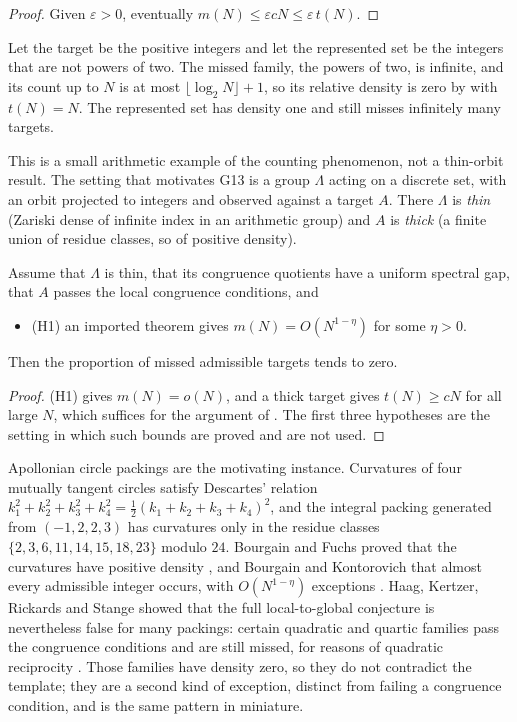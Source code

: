 \begin{proof}
Given $\varepsilon > 0$, eventually $m(N) \le \varepsilon c N \le \varepsilon\, t(N)$.
\end{proof}

\begin{example}\label{ex:G13-powers}
Let the target be the positive integers and let the represented set be the integers that are not
powers of two. The missed family, the powers of two, is infinite, and its count up to $N$ is at most
$\lfloor \log_2 N \rfloor + 1$, so its relative density is zero by  with
$t(N) = N$. The represented set has density one and still misses infinitely many targets.
\end{example}

This is a small arithmetic example of the counting phenomenon, not a thin-orbit result. The setting
that motivates G13 is a group $\Lambda$ acting on a discrete set, with an orbit projected to integers
and observed against a target $A$. There $\Lambda$ is \emph{thin} (Zariski dense of infinite index in
an arithmetic group) and $A$ is \emph{thick} (a finite union of residue classes, so of positive
density).

\begin{schema}\label{thm:G13}
Assume that $\Lambda$ is thin, that its congruence quotients have a uniform spectral gap, that $A$
passes the local congruence conditions, and
\begin{itemize}
  \item \textup{(H1)} an imported theorem gives $m(N) = O(N^{1-\eta})$ for some $\eta > 0$.
\end{itemize}
Then the proportion of missed admissible targets tends to zero.
\end{schema}

\begin{proof}
(H1) gives $m(N) = o(N)$, and a thick target gives $t(N) \ge cN$ for all large $N$, which suffices
for the argument of . The first three hypotheses are the setting in which such
bounds are proved and are not used.
\end{proof}

Apollonian circle packings are the motivating instance. Curvatures of four mutually tangent circles
satisfy Descartes' relation $k_1^2 + k_2^2 + k_3^2 + k_4^2 = \tfrac12 (k_1 + k_2 + k_3 + k_4)^2$,
and the integral packing generated from $(-1, 2, 2, 3)$ has curvatures only in the residue classes
$\{2, 3, 6, 11, 14, 15, 18, 23\}$ modulo $24$. Bourgain and Fuchs proved that the curvatures have
positive density \citep{BourgainFuchs2010}, and Bourgain and Kontorovich that almost every admissible
integer occurs, with $O(N^{1-\eta})$ exceptions \citep{BourgainKontorovich2014Apollonian}. Haag,
Kertzer, Rickards and Stange showed that the full local-to-global conjecture is nevertheless false
for many packings: certain quadratic and quartic families pass the congruence conditions and are
still missed, for reasons of quadratic reciprocity \citep{HaagEtAl2024}. Those families have density
zero, so they do not contradict the template; they are a second kind of exception, distinct from
failing a congruence condition, and  is the same pattern in miniature.
